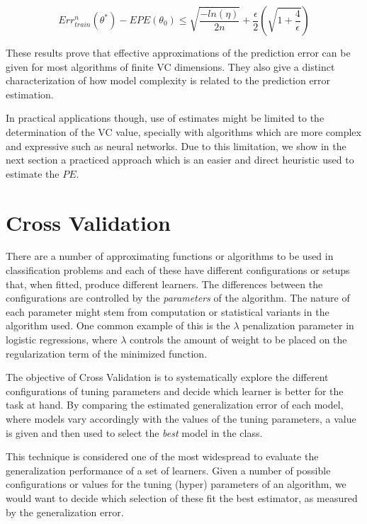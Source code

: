 \begin{equation}
Err^n_{train}(\theta^*) - EPE(\theta_0) \leq \sqrt{\frac{-ln(\eta)}{2n} } + \frac{\epsilon}{2}\left( \sqrt{1 + \frac{4}{\epsilon} } \right)
\end{equation} \label{eq:vapnik-classificationBoundPrecise}

These results prove that effective approximations of the prediction error can be given for most algorithms of finite VC dimensions. They also give a distinct characterization of how model complexity is related to the prediction error estimation.

In practical applications though, use of estimates might be limited to the determination of the VC value, specially with algorithms which are more complex and expressive such as neural networks. Due to this limitation, we show in the next section a practiced approach which is an easier and direct heuristic used to estimate the $PE$.


\section{Cross Validation}\label{section:crossValidation}
 There are a number of approximating functions or algorithms to be used in classification problems and each of these have different configurations or setups that, when fitted, produce different learners. The differences between the configurations are controlled by the \textit{parameters} of the algorithm. The nature of each parameter might stem from computation or statistical variants in the algorithm used. One common example of this is the $\lambda$ penalization parameter in logistic regressions, where $\lambda$ controls the amount of weight to be placed on the regularization term of the minimized function.

The objective of Cross Validation is to systematically explore the different configurations of tuning parameters and decide which learner is better for the task at hand. By comparing the estimated generalization error of each model, where models vary accordingly with the values of the tuning parameters, a value is given and then used to select the \textit{best} model in the class.

This technique is considered one of the most widespread to evaluate the generalization performance of a set of learners. Given a number of possible configurations or values for the tuning (hyper) parameters of an algorithm, we would want to decide which selection of these fit the best estimator, as measured by the generalization error. 

